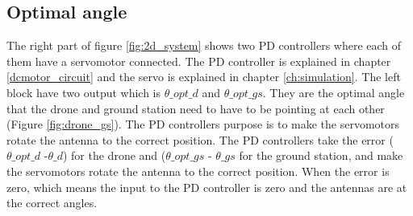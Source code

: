 \subsection{Optimal angle}
The right part of figure \ref{fig:2d_system} shows two PD controllers where each of them have a servomotor connected. The PD controller is explained in chapter \ref{dcmotor_circuit} and the servo is explained in chapter \ref{ch:simulation}. The left block have two output which is $\theta\_opt\_d$ and $\theta\_opt\_gs$. They are the optimal angle that the drone and ground station need to have to be pointing at each other (Figure \ref{fig:drone_gs}). The PD controllers purpose is to make the servomotors rotate the antenna to the correct position. The PD controllers take the error ($\theta\_opt\_d$ -$\theta\_d$) for the drone and ($\theta\_opt\_gs$ - $\theta\_gs$ for the ground station, and make the servomotors rotate the antenna to the correct position. When the error is zero, which means the input to the PD controller is zero and the antennas are at the correct angles.   
\newpage
